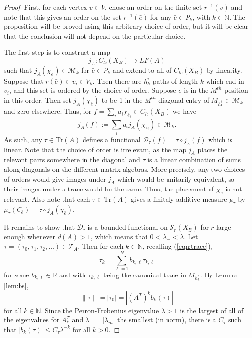 \documentclass[12pt]{amsart}
\theoremstyle{plain}
\theoremstyle{definition}
\begin{document}
\begin{proof}
    First, for each vertex $v\in V$, chose an order on the finite set $r^{-1}(v)$ and note that this gives an order on the set $r^{-1}(\bar{e})$ for any $\bar{e}\in P_k$, with $k\in\mathbb{N}$. The proposition will be proved using this arbitrary choice of order, but it will be clear that the conclusion will not depend on the particular choice.
    
    The first step is to construct a map 
    $$j_A:C_{lc}(X_B)\rightarrow LF(A)$$
    such that $j_A(\chi_{\bar{e}})\in \mathcal{M}_k$ for $\bar{e}\in P_k$ and extend to all of $C_{lc}(X_B)$ by linearity. Suppose that $r(\bar{e})\in v_i\in V_k$. Then there are $h_k^i$ paths of length $k$ which end in $v_i$, and this set is ordered by the choice of order. Suppose $\bar{e}$ is in the $M^{th}$ position in this order. Then set $j_A(\chi_{\bar{e}})$ to be 1 in the $M^{th}$  diagonal entry of $M_{h_k^i}\subset \mathcal{M}_k $ and zero elsewhere. Thus, for $f = \sum_i a_i \chi_{\bar{e}_i}\in C_{lc}(X_B)$ we have
    $$j_A(f) := \sum_i a_i j_A(\chi_{\bar{e}_i})\in \mathcal{M}_k .$$
    As such, any $\tau\in\mathrm{Tr}(A)$ defines a functional $\mathcal{D}_\tau(f) = \tau\circ j_A(f)$ which is linear. Note that the choice of order is irrelevant, as the map $j_A$ places the relevant parts somewhere in the diagonal and $\tau$ is a linear combination of sums along diagonals on the different matrix algebras. More precisely, any two choices of orders would give images under $j_A$ which would be unitarily equivalent, so their images under a trace would be the same. Thus, the placement of $\chi_{\bar{e}}$ is not relevant. Also note that each $\tau\in\mathrm{Tr}(A)$ gives a finitely additive measure $\mu_\tau$ by $\mu_\tau(C_{\bar{e}}) = \tau\circ j_A(\chi_{\bar{e}})$.
 
    It remains to show that $\mathcal{D}_\tau$ is a bounded functional on $\mathcal{S} _r(X_B)$ for $r$ large enough whenever $d(A)>1$, which means that $0<\lambda_-<\lambda$. Let $\tau = (\tau_0,\tau_1,\tau_2,\dots)\in \mathcal{T}_A$. Then for each $k\in\mathbb{N}$, recalling (\ref{eqn:trace}),
    $$\tau_k = \sum_{\ell=1}^N b_{k,\ell}\tau_{k,\ell}$$
    for some $b_{k,\ell}\in\mathbb{R}$ and with $\tau_{k,\ell}$ being the canonical trace in $M_{h_k^\ell}$.  By Lemma \ref{lem:bs},
    $$\|\tau\| = |\tau_0| = |(A^T)^k b_k(\tau) |$$
    for all $k\in\mathbb{N}$. Since the Perron-Frobenius eigenvalue $\lambda>1$ is the largest of all of the eigenvalues for $A_*^T$ and $\lambda_- = |\lambda_m|$ the smallest (in norm), there is a $C_{\tau}$ such that $|b_k(\tau)|\leq C_{\tau} \lambda_-^{-k}$ for all $k>0$.
    

\end{proof}
\end{document}
